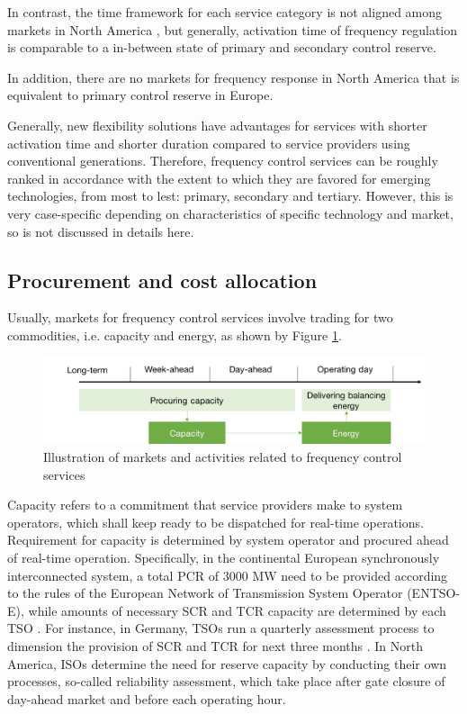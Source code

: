 In contrast, the time framework for each service category is not aligned among markets in North America \cite{EllisonJ.F.TesfatsionL.S.LooseV.W.Byrne2012}, but generally, activation time of frequency regulation is comparable to a in-between state of primary and secondary control reserve. 

In addition, there are no markets for frequency response in North America \cite{Rebours2009,EllisonJ.F.TesfatsionL.S.LooseV.W.Byrne2012} that is equivalent to primary control reserve in Europe.

Generally, new flexibility solutions have advantages for services with shorter activation time and shorter duration compared to service providers using conventional generations. Therefore, frequency control services can be roughly ranked in accordance with the extent to which they are favored for emerging technologies, from most to lest: primary, secondary and tertiary. However, this is very case-specific depending on characteristics of specific technology and market, so is not discussed in details here.

\subsection{Procurement and cost allocation}

Usually, markets for frequency control services involve trading for two commodities, i.e. capacity and energy, as shown by Figure \ref{fig:FCR_market}. 

\begin{figure}[h!]
	\centering
	\includegraphics[width=0.95\linewidth]{Figures/FCR_market}
	\caption{Illustration of markets and activities related to frequency control services}
	\label{fig:FCR_market}
\end{figure}

Capacity refers to a commitment that service providers make to system operators, which shall keep ready to be dispatched for real-time operations.  Requirement for capacity is determined by system operator and procured ahead of real-time operation. Specifically, in the continental European synchronously interconnected system, a total PCR of 3000 MW need to be provided according to the rules of the European Network of Transmission System Operator (ENTSO-E), while amounts of necessary SCR and TCR capacity are determined by each TSO \cite{ENTSO-e_handbook}. For instance, in Germany, TSOs run a quarterly assessment process to dimension the provision of SCR and TCR for next three months \cite{ConsentecGmbH2014}. In North America, ISOs determine the need for reserve capacity by conducting their own processes, so-called reliability assessment, which take place after gate closure of day-ahead market and before each operating hour\cite{EllisonJ.F.TesfatsionL.S.LooseV.W.Byrne2012}. 


